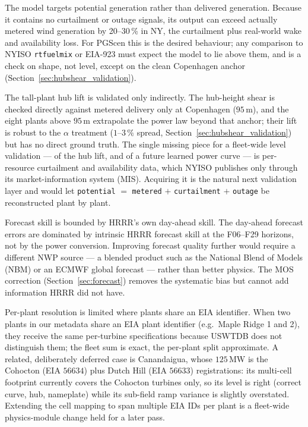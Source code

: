 \documentclass[11pt]{article}
\newcommand{\code}[1]{\texttt{\small #1}}
\begin{document}
The model targets potential generation rather than delivered generation.
Because it
contains no curtailment or outage signals, its output can exceed actually
metered wind generation by 20--30\,\% in NY, the curtailment plus
real-world wake and availability loss. For PGScen this is the desired
behaviour; any comparison to NYISO \code{rtfuelmix} or EIA-923 must
expect the model to lie above them, and is a check on shape, not level,
except on the clean Copenhagen anchor
(Section~\ref{sec:hubshear_validation}).

The tall-plant hub lift is validated only indirectly. The
hub-height shear is checked directly against metered delivery only at
Copenhagen ($95$\,m), and the eight plants above $95$\,m extrapolate the
power law beyond that anchor; their lift is robust to the $\alpha$
treatment ($1$--$3\,\%$ spread, Section~\ref{sec:hubshear_validation})
but has no direct ground truth. The single missing piece for a
fleet-wide level validation --- of the hub lift, and of a future learned
power curve --- is per-resource curtailment and availability data, which
NYISO publishes only through its market-information system (MIS).
Acquiring it is the natural next validation layer and would let
\code{potential} $=$ \code{metered} $+$ \code{curtailment} $+$
\code{outage} be reconstructed plant by plant.

Forecast skill is bounded by HRRR's own day-ahead skill. The
day-ahead forecast errors are dominated by intrinsic HRRR forecast
skill at the F06--F29 horizons, not by the power conversion. Improving
forecast quality further would require a different NWP source --- a
blended product such as the National Blend of Models (NBM) or an ECMWF
global forecast --- rather than better physics. The MOS correction
(Section~\ref{sec:forecast}) removes the systematic bias but cannot add
information HRRR did not have.

Per-plant resolution is limited where plants share an EIA identifier.
When two plants in our metadata share an EIA plant identifier (e.g.\
Maple Ridge 1 and 2), they receive the same per-turbine specifications
because USWTDB does not distinguish them; the fleet sum is exact, the
per-plant split approximate. A related, deliberately deferred case is Canandaigua, whose
$125$\,MW is the Cohocton (EIA $56634$) plus Dutch Hill (EIA $56633$)
registrations: its multi-cell footprint currently covers the Cohocton
turbines only, so its level is right (correct curve, hub, nameplate)
while its sub-field ramp variance is slightly overstated. Extending the
cell mapping to span multiple EIA IDs per plant is a fleet-wide
physics-module change held for a later pass.
\end{document}
